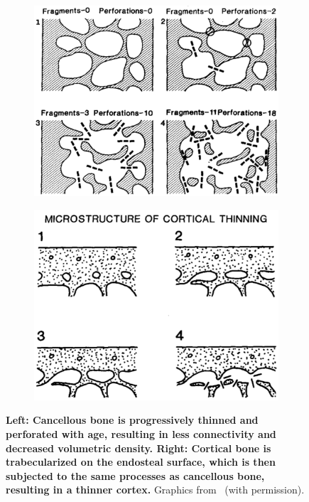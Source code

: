 \begin{figure}
\begin{subfigure}{0.49\linewidth}
\centering
\includegraphics[width=\linewidth]{./intro/Figures/Parfitt_1984_trabecPerf}
\end{subfigure}
\begin{subfigure}{.49\linewidth}
\centering
\includegraphics[width=\linewidth]{./intro/Figures/Parfitt_1984_cortexThinning}
\end{subfigure}
\caption[Age related changes in bone]{\textbf{Left: Cancellous bone is progressively thinned and perforated with age, resulting in less connectivity and decreased volumetric density. Right: Cortical bone is trabecularized on the endosteal surface, which is then subjected to the same processes as cancellous bone, resulting in a thinner cortex.} Graphics from~\citet{parfitt_age-related_1984} (with permission). }
\label{fig:bone_age}
\end{figure}

